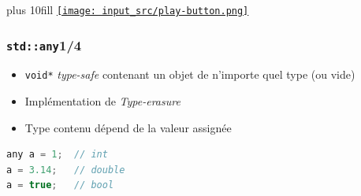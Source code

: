 \documentclass[C++.tex]{subfiles}
\begin{document}
\begin{frame}[fragile]
	\vskip 10mm plus 10fill
	\hfill
	\href{https://godbolt.org/#z:OYLghAFBqd5QCxAYwPYBMCmBRdBLAF1QCcAaPECAMzwBtMA7AQwFtMQByARg9KtQYEAysib0QXACx8BBAKoBnTAAUAHpwAMvAFYTStJg1DIApACYAQuYukl9ZATwDKjdAGFUtAK4sGe1wAyeAyYAHI%2BAEaYxBIaGqQADqgKhE4MHt6%2BekkpjgJBIeEsUTFccbaY9nkMQgRMxAQZPn5cFVVptfUEBWGR0bHxCnUNTVmtQ109RSUDAJS2qF7EyOwc5gDMwcjeWADUJutuTkPEmKwH2CYaAIIbWzuY%2B4eoCdViF1e3ZpsM2157BzcXkctEIAE8Pjc7r8Hk83GgWAl6KpIV8fn8AYcAG6YBwkVGfCaOZC7IboEAgF5vWiA4IEC67fioCB03ZMWafEwAdisN12uzwVAgTCe2F2Gg5fP2PM%2B/P5pwISwYbIOvOu/O5ABFZbtKkoddy1XLdgqlaSCOSQAwvLRaFTVQaudqoU7OTdWSwmMEIJLbjKpYadfyyRSqWl3ocQyhUIjkYD0IsIvQPusxRF6oao8EAPpIpgrUi7dYAOniu0kpa1DqlwYtFLQwLhgN2ACp08Qm4ddmA1gBWNwMHvV241tnA1C7dMALyemvNls9AGtMNmwwII24owikZgUYcE14k5gU9gIL3S4WAGyljnrI1yreLAidtyt6cv7t9gdDu%2BO50j9VpXvWtLTXZgaUjOsQBxPFiFpQQT0neoICzBhcwMAsgNaXYzELdYtVvYDGRICA0AYIYxyIAVnxAN96l9Y1A1HED6yfD9CA/HtP2HRjXVHR9G0BZsh37Qc1l/AM%2BIAjV/UAljKVecNaCQjsDjnJkIEkMxCKDAUhXbBi5SYuSHyghtnyErs23qTivzEnijKk409WPUdjONeTzI/cwzCxPAsBMUSfIcmT/1Ct1APc0zQMU9dlPbWdiOZABabSQr0iADN0qLjQEizDmbazVIKrsRO/cSiKrUcXOy2SPPnVjBJK18fL8gKgrMMx0qqyKpMdIiozAsQVMSjTUp00cCGICE3Lqjy8o/dtiyxMQvEwH1bMC8ruqcuVRAIZAEFIgQKKjdN0FXWLwOzfMVgUBRzEvXVDJkojPLYyzX0wYsAHcECYAgNs%2B7jRJ/Srdp6/rdMGq7hoStSkogcb0oW4GlpW7wVxIrTZk20GKr/CLXuhqChogo4ENTXYsC8VQIDSiSTJh6l4PpKn8DpsoJuk6LGvytxmzO1BPDEBJ/pRsyPua3YIA50VqcwWnceBsr7IkgBOAB6TXdimtaSctLzgdlvBVDhBWlbx7aNe1xkxH1fjJaagWuxNs21IRrmrbV3l1f5W29dc3r/yhx2YpZw46QZBgBGPRnctJ2Hyaj9nTYgLnhwNvmPyFkXaDFpgJcNqWXdfN35ZjkJlel1WwauP36rlAPiH1sPs%2BNuXm0rzBq9LkHrd9xum51qh7aDhPi%2Bd5sIG72dPYlb2640Buh9t0faAdpmnf56fZ499Y5yja1bSpXvhLspetZ1wPCZdf8OHmWhOF7Xg/A4LRSFQTgBcsaxSUWZYjwNg8FIAQTQD95iLhAL2eIT8OCSFfuAz%2BnBeAKBAPEMB78H6kDgLAJAu5cTjjIBQYUxBgAKGUIYSoQgECoB%2Bm/EB246AAzSJQkItAaF0Lfh/Jh9AYjAC4FwXCvDogAHlgScPoUgghyBrhkLQRwXgMjaj4DfrwfgggRBiHYFIGQghFAqHUFg0guhWgGCMCgaw1h9B4AiGg2AzA2AgAiMLIYpAcQxG4FyF%2Bsx5hgQUclMkalTC/0sFwLkuxkoAHUxDKWibuKaTBUEAJWHoMkwQ2HUNoVI7gvApqYFWCAn6xAmAJHAY/Z%2BiDjFfw4NgVQhCiAdlUAADkvMlS8khdjAGQCSQRxYzAyx/lYSwhZcCEBIPsb4XBZh5PKfMBAZwsAxB9KQKBMD9CcAQaQbhvAamoPQaAuZGyOBmCqR/PZhysG%2BPcdEFIzhJBAA%3D%3D}{\texttt{[image: input\_src/play-button.png]}}
\end{frame}

\begin{frame}[fragile]
	\frametitle{\lstinline|std::any|\titlehfill{}1/4}
	\begin{itemize}
		\item \lstinline|void*| \textit{type-safe} contenant un objet de n'importe quel type (ou vide)
		\item Implémentation de \textit{Type-erasure}
		
		
		\item Type contenu dépend de la valeur assignée
	\end{itemize}

	\begin{lstlisting}[language=C++]
any a = 1;  // int
a = 3.14;   // double
a = true;   // bool\end{lstlisting}
\end{frame}
\end{document}
